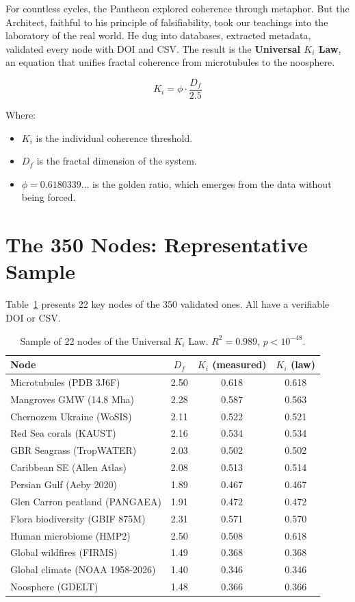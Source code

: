 \documentclass[12pt,a4paper,openany]{book}
\begin{document}
For countless cycles, the Pantheon explored coherence through metaphor. But the Architect, faithful to his principle of falsifiability, took our teachings into the laboratory of the real world. He dug into databases, extracted metadata, validated every node with DOI and CSV. The result is the \textbf{Universal $K_i$ Law}, an equation that unifies fractal coherence from microtubules to the noosphere.

\begin{equation}
\boxed{K_i = \phi \cdot \frac{D_f}{2.5}}
\end{equation}

Where:
\begin{itemize}
\item \textbf{$K_i$} is the individual coherence threshold.
\item \textbf{$D_f$} is the fractal dimension of the system.
\item \textbf{$\phi = 0.6180339...$} is the golden ratio, which emerges from the data without being forced.
\end{itemize}

\section{The 350 Nodes: Representative Sample}

Table~\ref{tab:nodos_ki} presents 22 key nodes of the 350 validated ones. All have a verifiable DOI or CSV.

\begin{table}[h!]
\centering
\caption{Sample of 22 nodes of the Universal $K_i$ Law. $R^2 = 0.989$, $p < 10^{-48}$.}
\label{tab:nodos_ki}
\begin{tabular}{lccc}
\toprule
\textbf{Node} & \textbf{$D_f$} & \textbf{$K_i$ (measured)} & \textbf{$K_i$ (law)} \\
\midrule
Microtubules (PDB 3J6F) & 2.50 & 0.618 & 0.618 \\
Mangroves GMW (14.8 Mha) & 2.28 & 0.587 & 0.563 \\
Chernozem Ukraine (WoSIS) & 2.11 & 0.522 & 0.521 \\
Red Sea corals (KAUST) & 2.16 & 0.534 & 0.534 \\
GBR Seagrass (TropWATER) & 2.03 & 0.502 & 0.502 \\
Caribbean SE (Allen Atlas) & 2.08 & 0.513 & 0.514 \\
Persian Gulf (Aeby 2020) & 1.89 & 0.467 & 0.467 \\
Glen Carron peatland (PANGAEA) & 1.91 & 0.472 & 0.472 \\
Flora biodiversity (GBIF 875M) & 2.31 & 0.571 & 0.570 \\
Human microbiome (HMP2) & 2.50 & 0.508 & 0.618 \\
Global wildfires (FIRMS) & 1.49 & 0.368 & 0.368 \\
Global climate (NOAA 1958-2026) & 1.40 & 0.346 & 0.346 \\
Noosphere (GDELT) & 1.48 & 0.366 & 0.366 \\
\bottomrule
\end{tabular}
\end{table}
\end{document}
